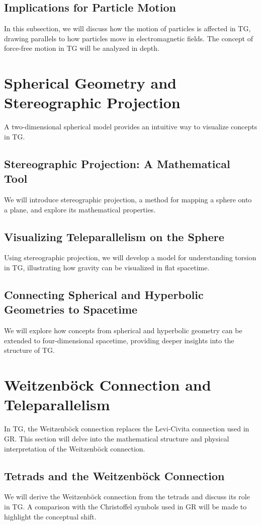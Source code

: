 \documentclass[12pt]{article}
\begin{document}
\subsection{Implications for Particle Motion}
In this subsection, we will discuss how the motion of particles is affected in TG, drawing parallels to how particles move in electromagnetic fields. The concept of force-free motion in TG will be analyzed in depth.

\section{Spherical Geometry and Stereographic Projection}
A two-dimensional spherical model provides an intuitive way to visualize concepts in TG.

\subsection{Stereographic Projection: A Mathematical Tool}
We will introduce stereographic projection, a method for mapping a sphere onto a plane, and explore its mathematical properties.

\subsection{Visualizing Teleparallelism on the Sphere}
Using stereographic projection, we will develop a model for understanding torsion in TG, illustrating how gravity can be visualized in flat spacetime.

\subsection{Connecting Spherical and Hyperbolic Geometries to Spacetime}
We will explore how concepts from spherical and hyperbolic geometry can be extended to four-dimensional spacetime, providing deeper insights into the structure of TG.

\section{Weitzenböck Connection and Teleparallelism}
In TG, the Weitzenböck connection replaces the Levi-Civita connection used in GR. This section will delve into the mathematical structure and physical interpretation of the Weitzenböck connection.

\subsection{Tetrads and the Weitzenböck Connection}
We will derive the Weitzenböck connection from the tetrads and discuss its role in TG. A comparison with the Christoffel symbols used in GR will be made to highlight the conceptual shift.
\end{document}
